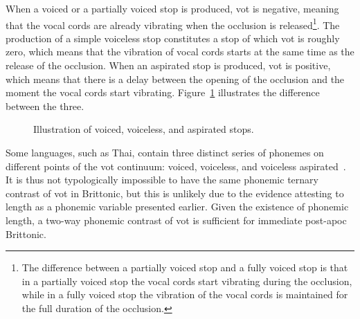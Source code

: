 When a voiced or a partially voiced stop is produced, \gls{vot} is negative, meaning that the vocal cords are already vibrating when the occlusion is released\footnote{The difference between a partially voiced stop and a fully voiced stop is that in a partially voiced stop the vocal cords start vibrating during the occlusion, while in a fully voiced stop the vibration of the vocal cords is maintained for the full duration of the occlusion.}. The production of a simple voiceless stop constitutes a stop of which \gls{vot} is roughly zero, which means that the vibration of vocal cords starts at the same time as the release of the occlusion. When an aspirated stop is produced, \gls{vot} is positive, which means that there is a delay between the opening of the occlusion and the moment the vocal cords start vibrating. Figure~\ref{fig:vvadiagram} illustrates the difference between the three.

\begin{figure}[h]
  \centering
  \caption{Illustration of voiced, voiceless, and aspirated stops.}
  \label{fig:vvadiagram}
\end{figure}
Some languages, such as Thai, contain three distinct series of \gls{phoneme}s on different points of the \gls{vot} continuum: voiced, voiceless, and voiceless aspirated~\autocite[82]{AW_VoiceOnset17}. It is thus not typologically impossible to have the same phonemic ternary contrast of \gls{vot} in Brittonic, but this is unlikely due to the evidence attesting to length as a phonemic variable presented earlier. Given the existence of phonemic length, a two-way phonemic contrast of \gls{vot} is sufficient for immediate post-\gls{apoc} Brittonic.



